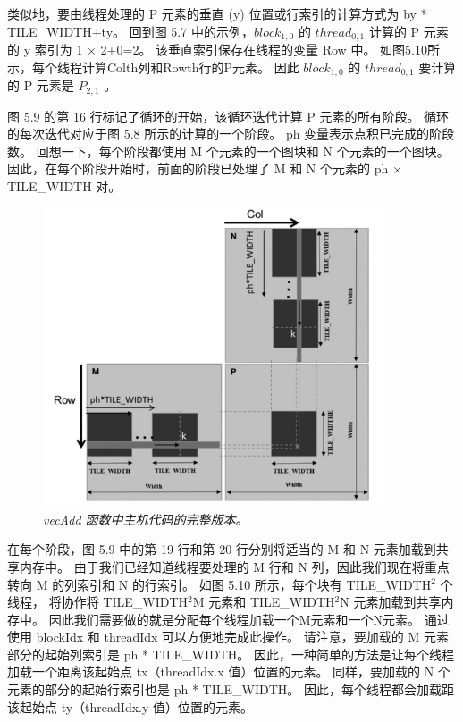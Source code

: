 类似地，要由线程处理的 P 元素的垂直 (y) 位置或行索引的计算方式为 by * TILE\_WIDTH+ty。 
回到图 5.7 中的示例，$block_{1,0}$ 的 $thread_{0,1}$ 计算的 P 元素的 y 索引为 1 × 2+0=2。 
该垂直索引保存在线程的变量 Row 中。  如图5.10所示，每个线程计算Colth列和Rowth行的P元素。 
因此 $block_{1,0}$ 的 $thread_{0,1}$ 要计算的 P 元素是 $P_{2,1}$ 。

图 5.9 的第 16 行标记了循环的开始，该循环迭代计算 P 元素的所有阶段。 
循环的每次迭代对应于图 5.8 所示的计算的一个阶段。 ph 变量表示点积已完成的阶段数。 
回想一下，每个阶段都使用 M 个元素的一个图块和 N 个元素的一个图块。 
因此，在每个阶段开始时，前面的阶段已处理了 M 和 N 个元素的 ph × TILE\_WIDTH 对。

\begin{figure}[H]
	\centering
	\includegraphics[width=0.9\textwidth]{figs/F5.10.png}
	\caption{\textit{\color{red} vecAdd 函数中主机代码的完整版本。}}
\end{figure}

在每个阶段，图 5.9 中的第 19 行和第 20 行分别将适当的 M 和 N 元素加载到共享内存中。 
由于我们已经知道线程要处理的 M 行和 N 列，因此我们现在将重点转向 M 的列索引和 N 的行索引。
如图 5.10 所示，每个块有 TILE\_WIDTH$^2$ 个线程， 
将协作将 TILE\_WIDTH$^2$M 元素和 TILE\_WIDTH$^2$N 元素加载到共享内存中。 
因此我们需要做的就是分配每个线程加载一个M元素和一个N元素。 通过使用 blockIdx 和 threadIdx 可以方便地完成此操作。 
请注意，要加载的 M 元素部分的起始列索引是 ph * TILE\_WIDTH。 
因此，一种简单的方法是让每个线程加载一个距离该起始点 tx（threadIdx.x 值）位置的元素。 
同样，要加载的 N 个元素的部分的起始行索引也是 ph * TILE\_WIDTH。 
因此，每个线程都会加载距该起始点 ty（threadIdx.y 值）位置的元素。

